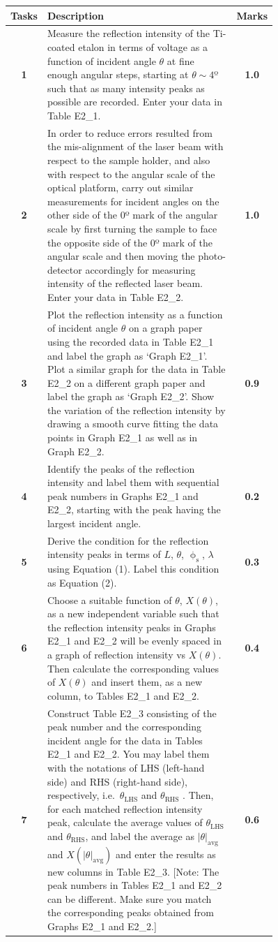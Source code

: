 \noindent\begin{tabular}{|c|p{0.76\linewidth}|c|}
\hline
\textbf{Tasks} & \centering\textbf{Description} & \textbf{Marks} \tabularnewline \hline
\textbf{1} & Measure the reflection intensity of the Ti-coated etalon in terms of voltage as a function of incident angle $\theta$ at fine enough angular steps, starting at $\theta \sim 4$º such that as many intensity peaks as possible are recorded. Enter your data in Table E2\_1. & \textbf{1.0} \\ \hline
\textbf{2} & In order to reduce errors resulted from the mis-alignment of the laser beam with respect to the sample holder, and also with respect to the angular scale of the optical platform, carry out similar measurements for incident angles on the other side of the 0º mark of the angular scale by first turning the sample to face the opposite side of the 0º mark of the angular scale and then moving the photo-detector accordingly for measuring intensity of the reflected laser beam. Enter your data in Table E2\_2. & \textbf{1.0} \\ \hline
\textbf{3} & Plot the reflection intensity as a function of incident angle $\theta$ on a graph paper using the recorded data in Table E2\_1 and label the graph as `Graph E2\_1'. Plot a similar graph for the data in Table E2\_2 on a different graph paper and label the graph as `Graph E2\_2'. Show the variation of the reflection intensity by drawing a smooth curve fitting the data points in Graph E2\_1 as well as in Graph E2\_2. & \textbf{0.9} \\ \hline
\textbf{4} & Identify the peaks of the reflection intensity and label them with sequential peak numbers in Graphs E2\_1 and E2\_2, starting with the peak having the largest incident angle. & \textbf{0.2} \\ \hline
\textbf{5} & Derive the condition for the reflection intensity peaks in terms of $L$, $\theta$, $\upphi_\mathrm{s}$, $\lambda$ using Equation (1). Label this condition as Equation (2). & \textbf{0.3} \\ \hline
\textbf{6} & Choose a suitable function of $\theta$, $X(\theta)$, as a new independent variable such that the reflection intensity peaks in Graphs E2\_1 and E2\_2 will be evenly spaced in a graph of reflection intensity vs $X(\theta)$. Then calculate the corresponding values of $X(\theta)$ and insert them, as a new column, to Tables E2\_1 and E2\_2. & \textbf{0.4} \\ \hline
\textbf{7} & Construct Table E2\_3 consisting of the peak number and the corresponding incident angle for the data in Tables E2\_1 and E2\_2. You may label them with the notations of LHS (left-hand side) and RHS (right-hand side), respectively, i.e.\ $\theta_\mathrm{LHS}$ and $\theta_\mathrm{RHS}$ . Then, for each matched reflection intensity peak, calculate the average values of $\theta_\mathrm{LHS}$ and $\theta_\mathrm{RHS}$, and label the average as $|\theta|_\mathrm{avg}$ and $X(|\theta|_\mathrm{avg})$ and enter the results as new columns in Table E2\_3. [Note: The peak numbers in Tables E2\_1 and E2\_2 can be different. Make sure you match the corresponding peaks obtained from Graphs E2\_1 and E2\_2.] & \textbf{0.6} \\ \hline

\end{tabular}

